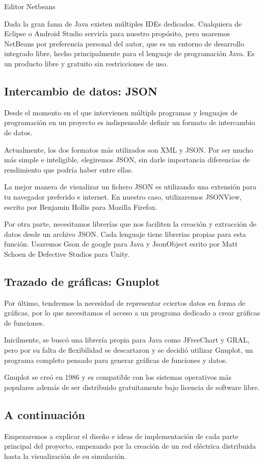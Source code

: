 \documentclass[12pt,a4paper,openright,oneside]{article}
\numberwithin{equation}{section}
\theoremstyle{definition}
\begin{document}
Editor Netbeans

Dada la gran fama de Java existen múltiples IDEs dedicados. Cualquiera de Eclipse o Android Studio serviría para nuestro propósito, pero usaremos NetBeans por preferencia personal del autor, que es un entorno de desarrollo integrado libre, hecho principalmente para el lenguaje de programación Java. Es un producto libre y gratuito sin restricciones de uso.

\subsection{Intercambio de datos: JSON}
Desde el momento en el que intervienen múltipls programas y lenguajes de programación en un proyecto es indispensable definir un formato de intercambio de datos.

Actualmente, los dos formatos más utilizados son XML y JSON. Por ser mucho más simple e inteligible, elegiremos JSON, sin darle importancia diferencias de rendimiento que podría haber entre ellas. 

La mejor manera de visualizar un fichero JSON es utilizando una extensión para tu navegador preferido e internet. En nuestro caso, utilizaremos JSONView, escrito por Benjamin Hollis para Mozilla Firefox.

Por otra parte, necesitamos librerías que nos faciliten la creación y extracción de datos desde un archivo JSON. Cada lenguaje tiene librerias propias para esta función. Usaremos Gson de google para Java y JsonObject esrito por Matt Schoen de Defective Studios para Unity.

\subsection{Trazado de gráficas: Gnuplot}
Por último, tendremos la necesidad de representar cciertos datos en forma de gráficas, por lo que necesitamos el acceso a un programa dedicado a crear gráficas de funciones.

Inicilmente, se buscó una librería propia para Java como JFreeChart y GRAL, pero por su falta de flexibilidad se descartaron y se decidió utilizar Gnuplot, un programa completo pensado para generar gráficas de funciones y datos.

Gnuplot se creó en 1986 y es compatible con los sistemas operativos más populares además de ser distribuido gratuitamente bajo licencia de software libre.

\subsection{A continuación}
Empezaremos a explicar el diseño e ideas de implementación de cada parte principal del proyecto, empezando por la creación de un red eléctrica distribuida hasta la visualización de su simulación.
\end{document}
